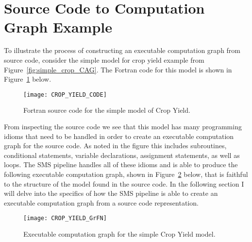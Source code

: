 \section{Source Code to Computation Graph Example\label{sec:code_to_cg}}
To illustrate the process of constructing an executable computation graph from source code, consider the simple model for crop yield example from Figure~\ref{fig:simple_crop_CAG}.
The Fortran code for this model is shown in Figure~\ref{crop_code} below.
\FloatBarrier
\begin{figure}[!htbp]
    \label{crop_code}
    \centering
    \texttt{[image: CROP\_YIELD\_CODE]}%
    \caption[Crop Yield Model Source Code]{Fortran source code for the simple model of Crop Yield.}
\end{figure}
\FloatBarrier

From inspecting the source code we see that this model has many programming idioms that need to be handled in order to create an executable computation graph for the source code.
As noted in the figure this includes subroutines, conditional statements, variable declarations, assignment statements, as well as loops.
The SMS pipeline handles all of these idioms and is able to produce the following executable computation graph, shown in Figure~\ref{crop_grfn_cg} below, that is faithful to the structure of the model found in the source code. In the following section I will delve into the specifics of how the SMS pipeline is able to create an executable computation graph from a source code representation.

\FloatBarrier
\begin{figure}[!htbp]
    \label{crop_grfn_cg}
    \centering
    \texttt{[image: CROP\_YIELD\_GrFN]}%
    \caption[Crop Yield Model GrFN CG]{Executable computation graph for the simple Crop Yield model.}
\end{figure}
\FloatBarrier

